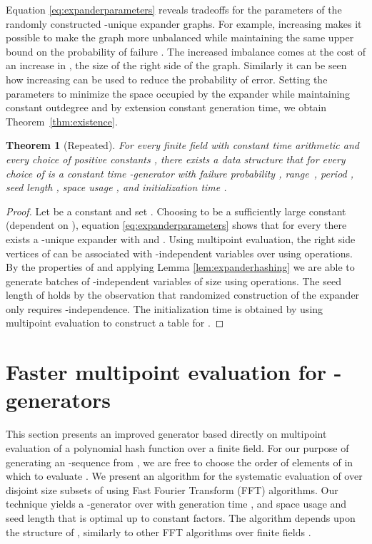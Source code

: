 \documentclass[a4paper,11pt]{article}
\theoremstyle{plain}
\newtheorem{restate}{Theorem}
\theoremstyle{definition}
\begin{document}
Equation \eqref{eq:expanderparameters} reveals tradeoffs for the parameters of the randomly constructed -unique expander graphs.
For example, increasing  makes it possible to make the graph more unbalanced while maintaining the same upper bound on the probability of failure . 
The increased imbalance comes at the cost of an increase in , the size of the right side of the graph. 
Similarly it can be seen how increasing  can be used to reduce the probability of error.
Setting the parameters to minimize the space occupied by the expander while maintaining constant outdegree and by extension constant generation time, we obtain Theorem~\ref{thm:existence}.  
\begin{restate}[Repeated]
For every finite field  with constant time arithmetic and every choice of positive constants ,  there exists a data structure 
that for every choice of  is a constant time -generator with failure probability ,
range~, period , seed length , space usage , and initialization time .
\end{restate}
\begin{proof}
Let  be a constant and set .
Choosing  to be a sufficiently large constant (dependent on ), equation \eqref{eq:expanderparameters} shows that 
for every  there exists a -unique expander  with  and .
Using multipoint evaluation, the right side vertices of  can be associated with -independent variables over  using  operations.
By the properties of  and applying Lemma \ref{lem:expanderhashing} we are able to generate batches of -independent variables of size  using  operations.
The seed length of  holds by the observation that randomized construction of the expander only requires -independence.
The  initialization time is obtained by using multipoint evaluation to construct a table for .
\end{proof}
\section{Faster multipoint evaluation for -generators} \label{sec:faster}
This section presents an improved generator based directly on multipoint evaluation of a polynomial hash function  over a finite field.
For our purpose of generating an -sequence from , we are free to choose the order of elements of  in which to evaluate .  
We present an algorithm for the systematic evaluation of  over disjoint size  subsets of  using Fast Fourier Transform (FFT) algorithms.
Our technique yields a -generator over  with generation time , and space usage and seed length that is optimal up to constant factors.
The algorithm depends upon the structure of , similarly to other FFT algorithms over finite fields \cite{bhattacharya2004}. 
\end{document}
